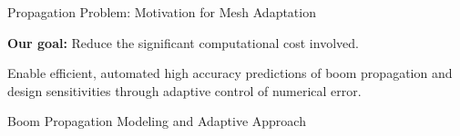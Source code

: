 \documentclass{beamer}
\begin{document}
\begin{frame}[t]{Propagation Problem: Motivation for Mesh Adaptation}
{%



}
\vspace{3.8cm}
{
\begin{minipage}[t]{1\linewidth}
  \textbf{Our goal:}
  Reduce the significant computational cost involved.

  Enable efficient, automated high accuracy predictions of boom propagation and design sensitivities through adaptive control of numerical error.
\end{minipage}
}

\vspace{-8pt}
\end{frame}


\begin{frame}[plain]
  \vfill
  \centering
  {Boom Propagation Modeling and Adaptive Approach}
  \vfill
\end{frame}
\end{document}
